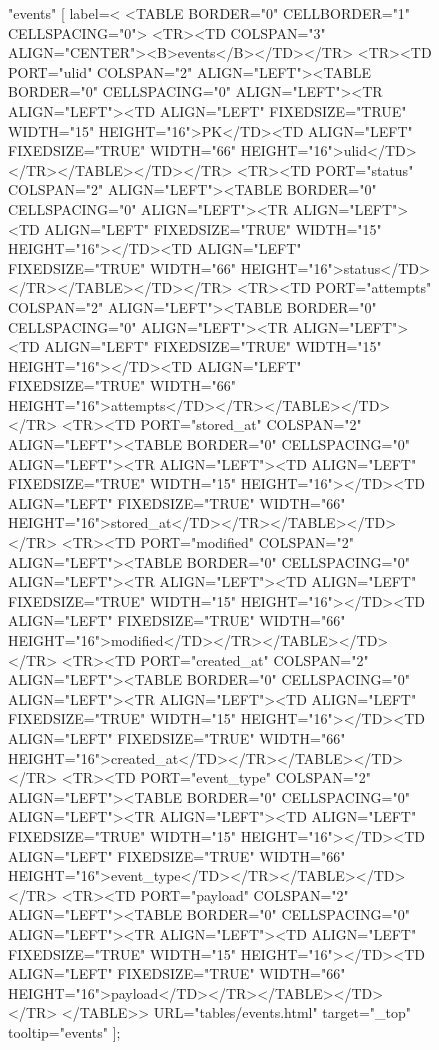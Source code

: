 \begin{figure}[t]
{  "events" [
   label=<
    <TABLE BORDER="0" CELLBORDER="1" CELLSPACING="0">
      <TR><TD COLSPAN="3" ALIGN="CENTER"><B>events</B></TD></TR>
      <TR><TD PORT="ulid" COLSPAN="2" ALIGN="LEFT"><TABLE BORDER="0" CELLSPACING="0" ALIGN="LEFT"><TR ALIGN="LEFT"><TD ALIGN="LEFT" FIXEDSIZE="TRUE" WIDTH="15" HEIGHT="16">PK</TD><TD ALIGN="LEFT" FIXEDSIZE="TRUE" WIDTH="66" HEIGHT="16">ulid</TD></TR></TABLE></TD></TR>
      <TR><TD PORT="status" COLSPAN="2" ALIGN="LEFT"><TABLE BORDER="0" CELLSPACING="0" ALIGN="LEFT"><TR ALIGN="LEFT"><TD ALIGN="LEFT" FIXEDSIZE="TRUE" WIDTH="15" HEIGHT="16"></TD><TD ALIGN="LEFT" FIXEDSIZE="TRUE" WIDTH="66" HEIGHT="16">status</TD></TR></TABLE></TD></TR>
      <TR><TD PORT="attempts" COLSPAN="2" ALIGN="LEFT"><TABLE BORDER="0" CELLSPACING="0" ALIGN="LEFT"><TR ALIGN="LEFT"><TD ALIGN="LEFT" FIXEDSIZE="TRUE" WIDTH="15" HEIGHT="16"></TD><TD ALIGN="LEFT" FIXEDSIZE="TRUE" WIDTH="66" HEIGHT="16">attempts</TD></TR></TABLE></TD></TR>
      <TR><TD PORT="stored_at" COLSPAN="2" ALIGN="LEFT"><TABLE BORDER="0" CELLSPACING="0" ALIGN="LEFT"><TR ALIGN="LEFT"><TD ALIGN="LEFT" FIXEDSIZE="TRUE" WIDTH="15" HEIGHT="16"></TD><TD ALIGN="LEFT" FIXEDSIZE="TRUE" WIDTH="66" HEIGHT="16">stored_at</TD></TR></TABLE></TD></TR>
      <TR><TD PORT="modified" COLSPAN="2" ALIGN="LEFT"><TABLE BORDER="0" CELLSPACING="0" ALIGN="LEFT"><TR ALIGN="LEFT"><TD ALIGN="LEFT" FIXEDSIZE="TRUE" WIDTH="15" HEIGHT="16"></TD><TD ALIGN="LEFT" FIXEDSIZE="TRUE" WIDTH="66" HEIGHT="16">modified</TD></TR></TABLE></TD></TR>
      <TR><TD PORT="created_at" COLSPAN="2" ALIGN="LEFT"><TABLE BORDER="0" CELLSPACING="0" ALIGN="LEFT"><TR ALIGN="LEFT"><TD ALIGN="LEFT" FIXEDSIZE="TRUE" WIDTH="15" HEIGHT="16"></TD><TD ALIGN="LEFT" FIXEDSIZE="TRUE" WIDTH="66" HEIGHT="16">created_at</TD></TR></TABLE></TD></TR>
      <TR><TD PORT="event_type" COLSPAN="2" ALIGN="LEFT"><TABLE BORDER="0" CELLSPACING="0" ALIGN="LEFT"><TR ALIGN="LEFT"><TD ALIGN="LEFT" FIXEDSIZE="TRUE" WIDTH="15" HEIGHT="16"></TD><TD ALIGN="LEFT" FIXEDSIZE="TRUE" WIDTH="66" HEIGHT="16">event_type</TD></TR></TABLE></TD></TR>
      <TR><TD PORT="payload" COLSPAN="2" ALIGN="LEFT"><TABLE BORDER="0" CELLSPACING="0" ALIGN="LEFT"><TR ALIGN="LEFT"><TD ALIGN="LEFT" FIXEDSIZE="TRUE" WIDTH="15" HEIGHT="16"></TD><TD ALIGN="LEFT" FIXEDSIZE="TRUE" WIDTH="66" HEIGHT="16">payload</TD></TR></TABLE></TD></TR>
    </TABLE>>
    URL="tables/events.html"
    target="_top"
    tooltip="events"
  ];

}
\end{figure}
